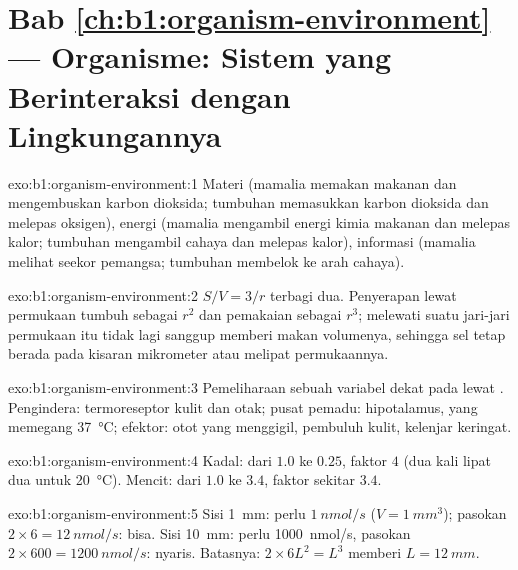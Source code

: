 \section*{Bab \ref{ch:b1:organism-environment} --- Organisme: Sistem yang Berinteraksi dengan Lingkungannya}

\begin{solution}{exo:b1:organism-environment:1}
Materi (mamalia memakan makanan dan mengembuskan karbon dioksida;
tumbuhan memasukkan karbon dioksida dan melepas oksigen), energi
(mamalia mengambil energi kimia makanan dan melepas kalor; tumbuhan
mengambil cahaya dan melepas kalor), informasi (mamalia melihat seekor
pemangsa; tumbuhan membelok ke arah cahaya).
\end{solution}

\begin{solution}{exo:b1:organism-environment:2}
$S/V = 3/r$ terbagi dua. Penyerapan lewat permukaan tumbuh sebagai $r^2$
dan pemakaian sebagai $r^3$; melewati suatu jari-jari permukaan itu tidak
lagi sanggup memberi makan volumenya, sehingga sel tetap berada pada
kisaran mikrometer atau melipat permukaannya.
\end{solution}

\begin{solution}{exo:b1:organism-environment:3}
Pemeliharaan sebuah variabel  dekat pada 
lewat . Pengindera: termoreseptor kulit dan otak;
pusat pemadu: hipotalamus, yang memegang 
\qty{37}{\celsius}; efektor: otot yang menggigil, pembuluh kulit,
kelenjar keringat.
\end{solution}

\begin{solution}{exo:b1:organism-environment:4}
Kadal: dari $1.0$ ke $0.25$, faktor $4$ (dua kali lipat dua untuk
\qty{20}{\celsius}). Mencit: dari $1.0$ ke $3.4$, faktor sekitar
$3.4$.
\end{solution}

\begin{solution}{exo:b1:organism-environment:5}
Sisi \qty{1}{mm}: perlu $\qty{1}{nmol/s}$ ($V = \qty{1}{mm^3}$); pasokan
$2\times 6 = \qty{12}{nmol/s}$: bisa. Sisi \qty{10}{mm}: perlu
\qty{1000}{nmol/s}, pasokan $2\times 600 = \qty{1200}{nmol/s}$: nyaris.
Batasnya: $2\times 6L^2 = L^3$ memberi $L = \qty{12}{mm}$.
\end{solution}

